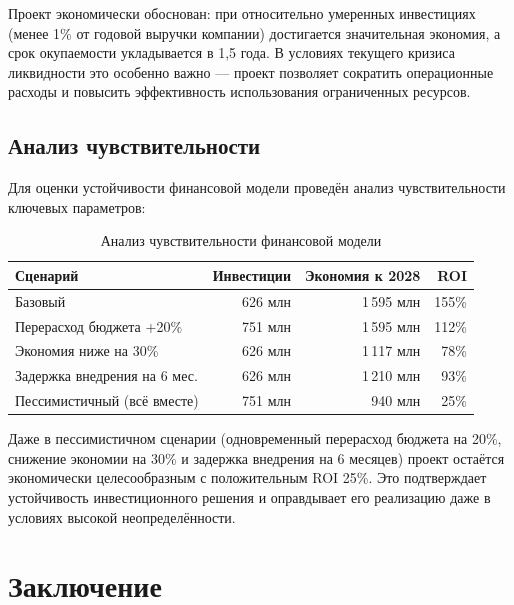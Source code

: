 \documentclass[12pt,a4paper]{article}
\begin{document}
Проект экономически обоснован: при относительно умеренных инвестициях (менее 1\% от годовой выручки компании) достигается значительная экономия, а срок окупаемости укладывается в 1,5 года. В условиях текущего кризиса ликвидности это особенно важно --- проект позволяет сократить операционные расходы и повысить эффективность использования ограниченных ресурсов.

\subsection{Анализ чувствительности}

Для оценки устойчивости финансовой модели проведён анализ чувствительности ключевых параметров:

\begin{table}[H]
\centering
\caption{Анализ чувствительности финансовой модели}
\label{tab:sensitivity}
\small
\begin{tabularx}{\textwidth}{|X|r|r|r|}
\hline
\rowcolor{samoletlight}
\textbf{Сценарий} & \textbf{Инвестиции} & \textbf{Экономия к 2028} & \textbf{ROI} \\
\hline
Базовый & 626 млн & 1\,595 млн & 155\% \\
\hline
Перерасход бюджета +20\% & 751 млн & 1\,595 млн & 112\% \\
\hline
Экономия ниже на 30\% & 626 млн & 1\,117 млн & 78\% \\
\hline
Задержка внедрения на 6 мес. & 626 млн & 1\,210 млн & 93\% \\
\hline
Пессимистичный (всё вместе) & 751 млн & 940 млн & 25\% \\
\hline
\end{tabularx}
\end{table}

Даже в пессимистичном сценарии (одновременный перерасход бюджета на 20\%, снижение экономии на 30\% и задержка внедрения на 6 месяцев) проект остаётся экономически целесообразным с положительным ROI 25\%. Это подтверждает устойчивость инвестиционного решения и оправдывает его реализацию даже в условиях высокой неопределённости.

\section*{Заключение}
\end{document}
